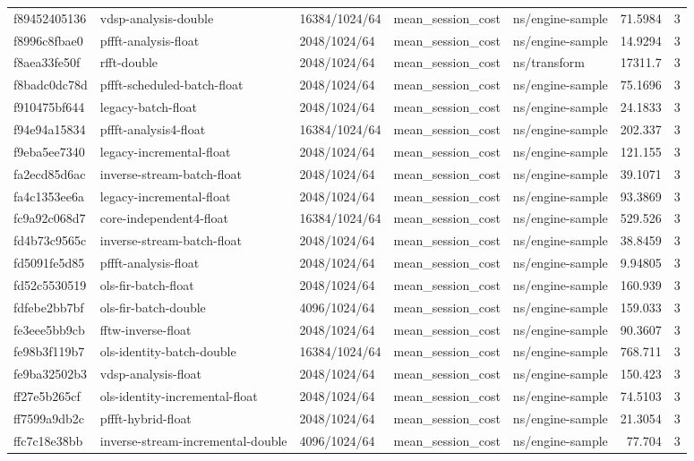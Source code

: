 \begin{longtable}{lllllrr}
f89452405136 & vdsp-analysis-double & 16384/1024/64 & mean\_session\_cost & ns/engine-sample & 71.5984 & 3 \\
f8996c8fbae0 & pffft-analysis-float & 2048/1024/64 & mean\_session\_cost & ns/engine-sample & 14.9294 & 3 \\
f8aea33fe50f & rfft-double & 2048/1024/64 & mean\_session\_cost & ns/transform & 17311.7 & 3 \\
f8badc0dc78d & pffft-scheduled-batch-float & 2048/1024/64 & mean\_session\_cost & ns/engine-sample & 75.1696 & 3 \\
f910475bf644 & legacy-batch-float & 2048/1024/64 & mean\_session\_cost & ns/engine-sample & 24.1833 & 3 \\
f94e94a15834 & pffft-analysis4-float & 16384/1024/64 & mean\_session\_cost & ns/engine-sample & 202.337 & 3 \\
f9eba5ee7340 & legacy-incremental-float & 2048/1024/64 & mean\_session\_cost & ns/engine-sample & 121.155 & 3 \\
fa2ecd85d6ac & inverse-stream-batch-float & 2048/1024/64 & mean\_session\_cost & ns/engine-sample & 39.1071 & 3 \\
fa4c1353ee6a & legacy-incremental-float & 2048/1024/64 & mean\_session\_cost & ns/engine-sample & 93.3869 & 3 \\
fc9a92c068d7 & core-independent4-float & 16384/1024/64 & mean\_session\_cost & ns/engine-sample & 529.526 & 3 \\
fd4b73c9565c & inverse-stream-batch-float & 2048/1024/64 & mean\_session\_cost & ns/engine-sample & 38.8459 & 3 \\
fd5091fe5d85 & pffft-analysis-float & 2048/1024/64 & mean\_session\_cost & ns/engine-sample & 9.94805 & 3 \\
fd52c5530519 & ols-fir-batch-float & 2048/1024/64 & mean\_session\_cost & ns/engine-sample & 160.939 & 3 \\
fdfebe2bb7bf & ols-fir-batch-double & 4096/1024/64 & mean\_session\_cost & ns/engine-sample & 159.033 & 3 \\
fe3eee5bb9cb & fftw-inverse-float & 2048/1024/64 & mean\_session\_cost & ns/engine-sample & 90.3607 & 3 \\
fe98b3f119b7 & ols-identity-batch-double & 16384/1024/64 & mean\_session\_cost & ns/engine-sample & 768.711 & 3 \\
fe9ba32502b3 & vdsp-analysis-float & 2048/1024/64 & mean\_session\_cost & ns/engine-sample & 150.423 & 3 \\
ff27e5b265cf & ols-identity-incremental-float & 2048/1024/64 & mean\_session\_cost & ns/engine-sample & 74.5103 & 3 \\
ff7599a9db2c & pffft-hybrid-float & 2048/1024/64 & mean\_session\_cost & ns/engine-sample & 21.3054 & 3 \\
ffc7c18e38bb & inverse-stream-incremental-double & 4096/1024/64 & mean\_session\_cost & ns/engine-sample & 77.704 & 3 \\
\end{longtable}
\endgroup
